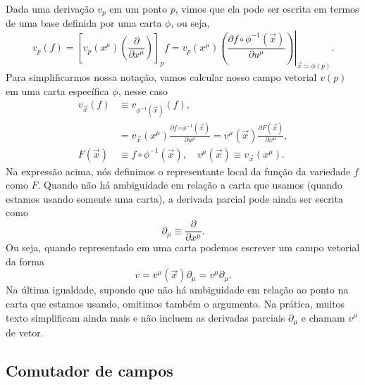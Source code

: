 Dada uma derivação $v_p$ em um ponto $p$, vimos que ela pode ser escrita em termos de uma base definida por uma carta $\phi$, ou seja,
\begin{equation}
	v_p(f) = \left[v_p(x^\mu)\left(\frac{\partial}{\partial x^\mu}\right)\right]_pf = \left.v_p(x^\mu)\left(\frac{\partial f \circ\phi^{-1}(\vec{x})}{\partial u^\mu}\right)\right\vert_{\vec{x}=\phi(p)}.
\end{equation}
Para simplificarmos nossa notação, vamos calcular nosso campo vetorial $v(p)$ em uma carta específica $\phi$, nesse caso
\begin{equation}
	\begin{split}
		v_{\vec{x}}(f) & \equiv v_{\phi^{-1}(\vec{x})}(f),                                                                                                        \\
		               & =v_{\vec{x}}(x^\mu)\frac{\partial f \circ\phi^{-1}(\vec{x})}{\partial u^\mu} = v^\mu(\vec{x})\frac{\partial F(\vec{x})}{\partial x^\mu}, \\
		F(\vec{x})     & \equiv f \circ\phi^{-1}(\vec{x}),\quad v^\mu(\vec{x}) \equiv v_{\vec{x}}(x^\mu).
	\end{split}
\end{equation}
Na expressão acima, nós definimos o representante local da função da variedade
$f$ como $F$. Quando não há ambiguidade em relação a carta que usamos (quando estamos usando somente uma carta), a derivada parcial pode ainda ser escrita como
\begin{equation}
	\partial_\mu  \equiv \frac{\partial }{\partial x^\mu}.
\end{equation}
Ou seja, quando representado em uma carta podemos escrever um campo vetorial da
forma
\begin{equation}
	v = v^\mu(\vec{x})\partial_\mu = v^\mu\partial_\mu.
\end{equation}
Na última igualdade, supondo que não há ambiguidade em relação ao ponto na carta
que estamos usando, omitimos também o argumento. Na prática, muitos texto
simplificam ainda mais e não incluem as derivadas parciais $\partial_\mu$ e
chamam $v^\mu$ de vetor.

\subsection{Comutador de campos}

